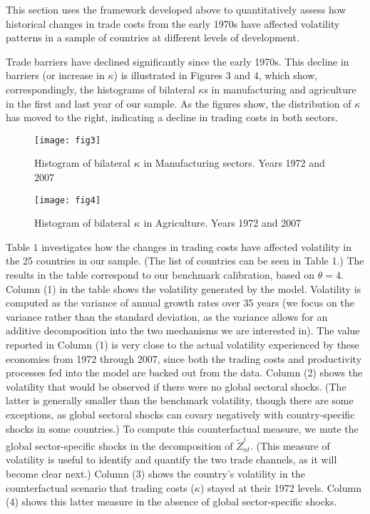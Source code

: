 \documentclass[12pt]{article}
\begin{document}
This section uses the framework developed above to quantitatively assess how
historical changes in trade costs from the early 1970s have affected
volatility patterns in a sample of countries at different levels of
development.

Trade barriers have declined significantly since the early 1970s. This
decline in barriers (or increase in $\kappa $) is illustrated in Figures $3$
and $4$, which show, correspondingly, the histograms of bilateral $\kappa $s
in manufacturing and agriculture in the first and last year of our sample.
As the figures show, the distribution of $\kappa $ has moved to the right,
indicating a decline in trading costs in both sectors.\vspace{2cm}

\begin{figure}[ph]
\caption{Histogram of bilateral $\protect\kappa $ in Manufacturing sectors.
Years 1972 and 2007}\centering
\texttt{[image: fig3]}
\end{figure}
\vspace{2cm}

\begin{figure}[h]
\caption{Histogram of bilateral $\protect\kappa $ in Agriculture. Years 1972
and 2007}\centering
\texttt{[image: fig4]}
\end{figure}
\vspace{2cm}

Table $1$ investigates how the changes in trading costs have affected
volatility in the 25 countries in our sample. (The list of countries can be
seen in Table 1.) The results in the table correspond to our benchmark
calibration, based on $\theta =4.$ Column (1) in the table shows the
volatility generated by the model. Volatility is computed as the variance of
annual growth rates over 35 years (we focus on the variance rather than the
standard deviation, as the variance allows for an additive decomposition
into the two mechanisms we are interested in). The value reported in Column
(1) is very close to the actual volatility experienced by these economies
from 1972 through 2007, since both the trading costs and productivity
processes fed into the model are backed out from the data. Column (2) shows
the volatility that would be observed if there were no global sectoral
shocks. (The latter is generally smaller than the benchmark volatility,
though there are some exceptions, as global sectoral shocks can covary
negatively with country-specific shocks in some countries.) To compute this
counterfactual measure, we mute the global sector-specific shocks in the
decomposition of $\tilde{Z}_{nt}^{j}$. (This measure of volatility is useful
to identify and quantify the two trade channels, as it will become clear
next.) Column (3) shows the country's volatility in the counterfactual
scenario that trading costs ($\kappa $) stayed at their 1972 levels. Column
(4) shows this latter measure in the absence of global sector-specific
shocks.
\end{document}
